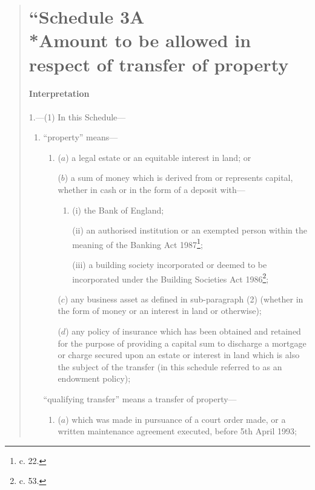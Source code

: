 \documentclass[a4paper]{article}
\begin{document}
\begin{quotation}
\part*{``Schedule 3A\\*Amount to be allowed in respect of transfer of property}

\subsection*{Interpretation}

1.—(1) In this Schedule—
\begin{enumerate}\item[]
“property” means—
\begin{enumerate}\item[]
($a$) a legal estate or an equitable interest in land; or

($b$) a sum of money which is derived from or represents capital, whether in cash or in the form of a deposit with—
\begin{enumerate}\item[]
(i) the Bank of England;

(ii) an authorised institution or an exempted person within the meaning of the Banking Act 1987\footnote{ c. 22.};

(iii) a building society incorporated or deemed to be incorporated under the Building Societies Act 1986\footnote{ c. 53.};
\end{enumerate}

\begin{sloppypar}
($c$) any business asset as defined in sub-paragraph (2) (whether in the form of money or an interest in land or otherwise);
\end{sloppypar}

($d$) any policy of insurance which has been obtained and retained for the purpose of providing a capital sum to discharge a mortgage or charge secured upon an estate or interest in land which is also the subject of the transfer (in this schedule referred to as an endowment policy);
\end{enumerate}

“qualifying transfer” means a transfer of property—
\begin{enumerate}\item[]
($a$) which was made in pursuance of a court order made, or a written maintenance agreement executed, before 5th April 1993;


\end{enumerate}
\end{enumerate}
\end{quotation}
\end{document}
